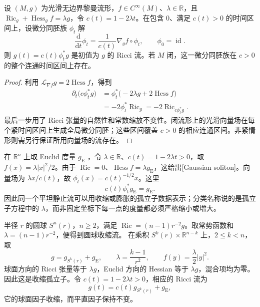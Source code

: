 \begin{proposition}\label{g3:prop:soliton-selfsimilar-flow}
	设 \((M,g)\) 为光滑无边界黎曼流形，\(f\in C^\infty(M)\)、\(\lambda\in\mathbb R\)，且 \(\operatorname{Ric}_g+\operatorname{Hess}_gf=\lambda g\)，令 \(c(t)=1-2\lambda t\)。在包含 \(0\)、满足 \(c(t)>0\) 的时间区间上，设微分同胚族 \(\phi_t\) 解
	\[
		\frac{\mathrm d}{\mathrm dt}\phi_t
		=\frac1{c(t)}\nabla_g f\circ\phi_t,
		\qquad \phi_0=\operatorname{id}.
	\]
	则 \(g(t)=c(t)\phi_t^*g\) 是初值为 \(g\) 的 Ricci 流。若 \(M\) 闭，这一微分同胚族在 \(c>0\) 的整个连通时间区间上存在。
\end{proposition}
\begin{proof}
	利用 \(\mathcal L_{\nabla f}g=2\operatorname{Hess}f\)，得到
	\[
		\begin{aligned}
		\partial_t\bigl(c\phi_t^*g\bigr)
		&=\phi_t^*\bigl(-2\lambda g+2\operatorname{Hess}f\bigr)\\
		&=-2\phi_t^*\operatorname{Ric}_g
		=-2\operatorname{Ric}_{c\phi_t^*g}.
		\end{aligned}
	\]
	最后一步用了 Ricci 张量的自然性和常数缩放不变性。闭流形上的光滑向量场在每个紧时间区间上生成全局微分同胚；这些区间覆盖 \(c>0\) 的相应连通区间。非紧情形则需另行保证所用向量场的流存在。
\end{proof}

\begin{example}\label{g3:exm:gaussian-ricci-soliton}
	在 \(\mathbb R^n\) 上取 Euclid 度量 \(g_{\mathrm E}\) ，令 \(\lambda\in\mathbb R\)、\(c(t)=1-2\lambda t>0\)，取 \(f(x)=\lambda|x|^2/2\)。由于 \(\operatorname{Ric}=0\)、\(\operatorname{Hess}f=\lambda g_{\mathrm E}\)，这给出[Gaussian soliton]。向量场为 \(\lambda x/c(t)\)，故 \(\phi_t(x)=c(t)^{-1/2}x\)。这里
	\[
		c(t)\phi_t^*g_{\mathrm E}=g_{\mathrm E}.
	\]
	因此同一个平坦静止流可以用收缩或膨胀的孤立子数据表示；分类名称说的是孤立子方程中的 \(\lambda\)，而非固定坐标下每一点的度量都必须严格缩小或增大。
\end{example}

\begin{example}\label{g3:exm:round-cylinder-soliton}
	半径 \(r\) 的圆球 \(S^n(r)\)，\(n\ge2\)，满足 \(\operatorname{Ric}=(n-1)r^{-2}g\)。取常势函数和 \(\lambda=(n-1)r^{-2}\)，便得到圆球收缩流。
	在乘积 \(S^k(r)\times\mathbb R^{n-k}\) 上，\(2\le k<n\)，取
	\[
		g=g_{S^k(r)}+g_{\mathrm E},\qquad
		\lambda=\frac{k-1}{r^2},\qquad
		f(y)=\frac\lambda2|y|^2.
	\]
	球面方向的 Ricci 张量等于 \(\lambda g\)，Euclid 方向的 Hessian 等于 \(\lambda g\)，混合项均为零。因此这是收缩孤立子。令 \(c(t)=1-2\lambda t>0\)，相应的 Ricci 流为
	\[
		g(t)=c(t)g_{S^k(r)}+g_{\mathrm E},
	\]
	它的球面因子收缩，而平直因子保持不变。
\end{example}


